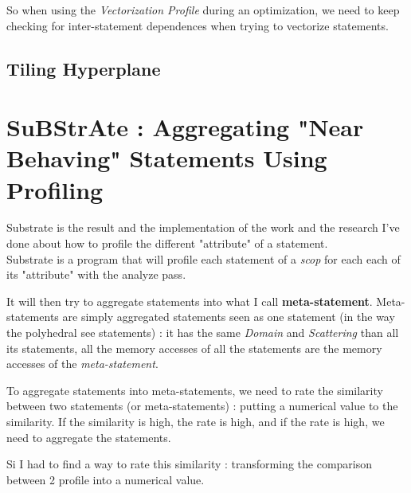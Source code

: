 \documentclass[paper=a4, fontsize=11pt]{scrartcl}
\numberwithin{equation}{section}        %
\numberwithin{figure}{section}          %
\numberwithin{table}{section}               %
\begin{document}
    So when using the \textit{Vectorization Profile} during an optimization, we need to keep
    checking for inter-statement dependences when trying to vectorize statements.


    \subsection{Tiling Hyperplane}

\section{SuBStrAte : Aggregating "Near Behaving" Statements Using Profiling}
    Substrate is the result and the implementation of the work and the research I've done
    about how to profile the different "attribute" of a statement.\\
    Substrate is a program that will profile each statement of a \textit{scop} for
    each each of its "attribute" with the analyze pass.

    It will then try to aggregate
    statements into what I call \textbf{meta-statement}. Meta-statements are simply
    aggregated statements seen as one statement (in the way the polyhedral see statements)
    : it has the same \textit{Domain} and \textit{Scattering} than all its statements,
    all the memory accesses of all the statements are the memory accesses of the \textit{meta-statement}.

    To aggregate statements into meta-statements, we need to rate the similarity between two
    statements (or meta-statements) : putting a numerical value to the similarity.
    If the similarity is high, the rate is high, and if the rate is high, we need to
    aggregate the statements.

    Si I had to find a way to rate this similarity : transforming the comparison between
    2 profile into a numerical value.
\end{document}
